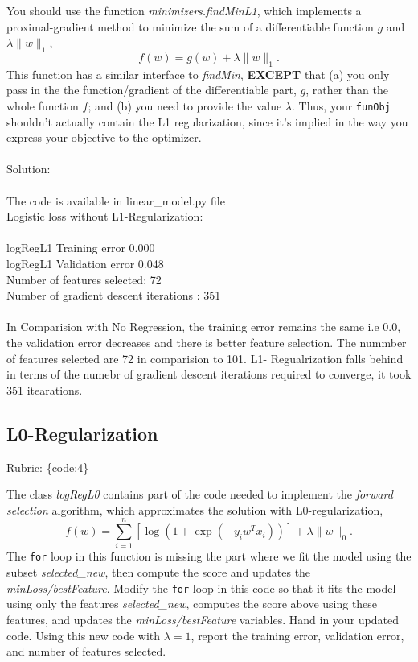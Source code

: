\documentclass{article}
\def\rubric#1{\gre{Rubric: \{#1\}}}{}
\def\blu#1{{\color{blu}#1}}
\def\gre#1{{\color{gre}#1}}
\def\norm#1{\|#1\|}
\begin{document}
You should use the function \emph{minimizers.findMinL1}, which implements a
proximal-gradient method to minimize the sum of a differentiable function $g$ and $\lambda\norm{w}_1$,
\[
f(w) = g(w) + \lambda \norm{w}_1.
\]
This function has a similar interface to \emph{findMin}, \textbf{EXCEPT} that (a) you
only pass in the the function/gradient of the differentiable
part, $g$, rather than the whole function $f$; and (b) you need to provide the value $\lambda$.
Thus, your \texttt{funObj} shouldn't actually contain the L1 regularization, since it's implied
in the way you express your objective to the optimizer. \\ \\
\blu{Solution: \\ \\
The code is available in linear\_model.py file  \\
Logistic loss without L1-Regularization: \\ \\
logRegL1 Training error 0.000 \\
logRegL1 Validation error 0.048 \\
Number of features selected: 72 \\
Number of gradient descent iterations : 351\\ \\
In Comparision with No Regression, the training error remains the same i.e 0.0, the validation error decreases and there is better feature selection. The nummber of features selected are 72 in comparision to 101. L1- Regualrization falls behind in terms of the  numebr of gradient descent iterations required to converge, it took 351 itearations.
}
\subsection{L0-Regularization}
\rubric{code:4}

The class \emph{logRegL0} contains part of the code needed to implement the \emph{forward selection} algorithm,
which approximates the solution with L0-regularization,
\[
f(w) =  \sum_{i=1}^n \left[\log(1+\exp(-y_iw^Tx_i))\right] + \lambda\norm{w}_0.
\]
The \texttt{for} loop in this function is missing the part where we fit the model using the subset \emph{selected\_new},
then compute the score and updates the \emph{minLoss/bestFeature}.
Modify the \texttt{for} loop in this code so that it fits the model using only
the features \emph{selected\_new}, computes the score above using these features,
and updates the \emph{minLoss/bestFeature} variables.
\blu{Hand in your updated code. Using this new code with $\lambda=1$,
report the training error, validation error, and number of features selected.}
\end{document}
